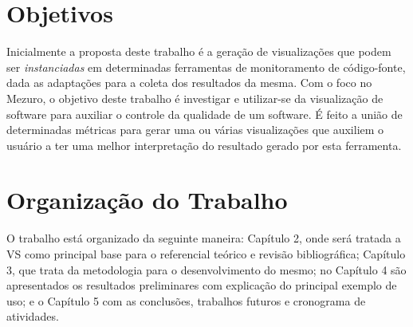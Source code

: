 \section{Objetivos}

Inicialmente a proposta deste trabalho é a geração de visualizações que podem
ser \textit{instanciadas} em determinadas ferramentas de monitoramento de
código-fonte, dada as adaptações para a coleta dos resultados da mesma. Com o
foco no Mezuro, o objetivo deste trabalho é investigar e utilizar-se da
visualização de software para auxiliar o controle da qualidade de um software.
É feito a união de determinadas métricas para gerar uma ou várias visualizações
que auxiliem o usuário a ter uma melhor interpretação do resultado gerado por
esta ferramenta.

\section{Organização do Trabalho}

O trabalho está organizado da seguinte maneira: Capítulo 2, onde será tratada a
VS como principal base para o referencial teórico e revisão bibliográfica;
Capítulo 3, que trata da metodologia para o desenvolvimento do mesmo; no
Capítulo 4 são apresentados os resultados preliminares com explicação do
principal exemplo de uso; e o Capítulo 5 com as conclusões, trabalhos futuros e
cronograma de atividades.
